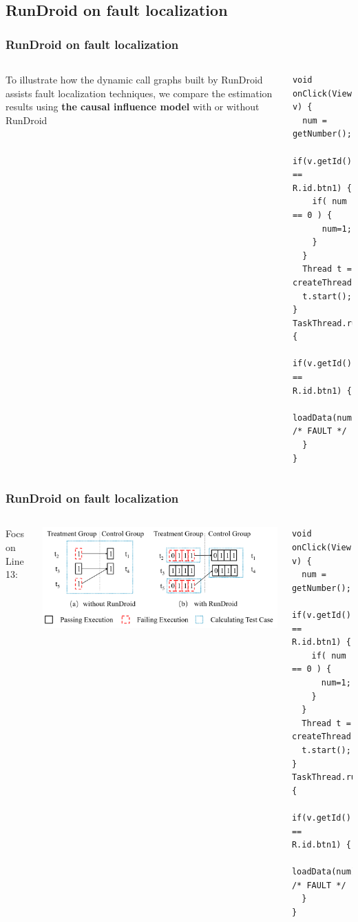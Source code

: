 \documentclass{beamer}
\begin{document}
\subsection{RunDroid on fault localization}
\begin{frame}[fragile]
\frametitle{RunDroid on fault localization}

\begin{columns}
	
	To illustrate how the dynamic call graphs built by RunDroid assists fault localization techniques, we compare the estimation results using \textbf{the causal influence model} with or without RunDroid
	\begin{lstlisting}
void onClick(View v) {
  num = getNumber();
  if(v.getId() == R.id.btn1) {
    if( num == 0 ) {
      num=1;
    }
  }
  Thread t = createThread(v.getId());
  t.start();
}                  
TaskThread.run() {
  if(v.getId() == R.id.btn1) {
    loadData(num); /* FAULT */
  }
}       
\end{lstlisting}

	
\end{columns}
\end{frame}
\begin{frame}[fragile]
\frametitle{RunDroid on fault localization}


\begin{columns}
	
	Focs on Line 13:
	
	\centering
	\includegraphics[keepaspectratio=true,width=\linewidth]{treatment.png}
\begin{lstlisting}
void onClick(View v) {
  num = getNumber();
  if(v.getId() == R.id.btn1) {
    if( num == 0 ) {
      num=1;
    }
  }
  Thread t = createThread(v.getId());
  t.start();
}                  
TaskThread.run() {
  if(v.getId() == R.id.btn1) {
    loadData(num); /* FAULT */
  }
}       
\end{lstlisting}
	
\end{columns}

\end{frame}
\end{document}
